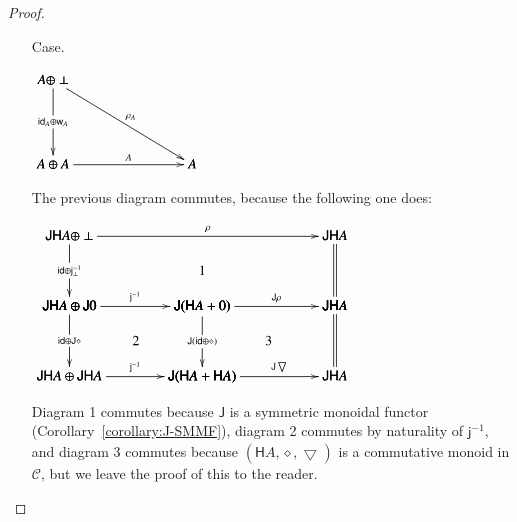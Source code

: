 \documentclass{lmcs}
\let\c\relax
\let\wn\relax
\newcommand{\cat}[1]{\mathcal{#1}}
\newcommand{\func}[1]{\mathsf{#1}}
\newcommand{\id}[0]{\mathsf{id}}
\newcommand{\w}[1]{\mathsf{w}_{#1}}
\newcommand{\c}[1]{\mathsf{c}_{#1}}
\newcommand{\jinv}[1]{\mathsf{j}^{-1}_{#1}}
\newcommand{\wn}[0]{\mathop{?}}
\newcommand{\codiag}[1]{\bigtriangledown_{#1}}
\newenvironment{diagram}{
  \begin{center}
    \begin{math}
      \bfig
}{
      \efig
    \end{math}
  \end{center}
}
\begin{document}
\begin{proof}
\begin{itemize}
\begin{diagram}
      \square(0,-500)|amma|/`->`->`->/<950,500>[
        \func{J}(\func{H}A + \func{H}A) \oplus \func{JH}A`
        \func{J}((\func{H}A + \func{H}A) + \func{H}A)`
        \func{JH}A \oplus \func{JH}A`
        \func{J}(\func{H}A + \func{H}A);`
        \func{J}\codiag{} \oplus \id`
        \func{J}(\codiag{} + \id)`
        \jinv{}]

      \dtriangle(950,-500)|ama|/`->`->/<1900,500>[
        \func{J}(\func{H}A + \func{H}A)`
        \func{J}(\func{H}A + \func{H}A)`
        \func{JH}A;`
        \func{J}\codiag{}`
        \func{J}\codiag{}]

      \place(950,250)[(1)]
      \place(2375,250)[(2)]
      \place(475,-250)[(3)]
      \place(1900,-250)[(4)]
    \end{diagram}
    Diagram 1 commutes because $\func{J}$ is a symmetric monoidal
    functor (Corollary~\ref{corollary:J-SMMF}), diagrams 2 and 3
    commute by naturality of $\jinv{}$, and diagram 4 commutes because
    $(\func{H}A, \diamond, \codiag{})$ is a commutative monoid in
    $\cat{C}$, but we leave the proof of this to the reader.

  \item[Case.]\ \\
    \begin{diagram}
      \btriangle|maa|/->`->`->/<1000,600>[
        \wn A \oplus \perp`
        \wn A \oplus \wn A`
        \wn A;
        \id_{\wn A} \oplus \w{A}`
        \rho_{\wn A}`
        \c{A}]
    \end{diagram}
    The previous diagram commutes, because the following one does:
    \begin{diagram}
      \square|amma|/->`->`->`->/<950,500>[
        \func{JH}A \oplus \func{J}0`
        \func{J}(\func{H}A + 0)`
        \func{JH}A \oplus \func{JH}A`
        \func{J}(\func{H}A + \func{H}A);
        \jinv{}`
        \id \oplus \func{J}\diamond`
        \func{J}(\id \oplus \diamond)`
        \jinv{}]

      \square(950,0)|amma|/->``=`->/<950,500>[
        \func{J}(\func{H}A + 0)`
        \func{JH}A`
        \func{J}(\func{H}A + \func{H}A)`
        \func{JH}A;
        \func{J}\rho```
        \func{J}\codiag{}]

      \square(0,500)|amma|/->`->`=`/<1900,500>[
        \func{JH}A \oplus \perp`
        \func{JH}A`
        \func{JH}A \oplus \func{J}0`
        \func{JH}A;
        \rho`
        \id \oplus \jinv{\perp}``]

      \place(950,750)[1]
      \place(475,250)[2]
      \place(1425,250)[3]      
    \end{diagram}
    Diagram 1 commutes because $\func{J}$ is a symmetric monoidal
    functor (Corollary~\ref{corollary:J-SMMF}), diagram 2 commutes by
    naturality of $\jinv{}$, and diagram 3 commutes because
    $(\func{H}A, \diamond, \codiag{})$ is a commutative monoid in
    $\cat{C}$, but we leave the proof of this to the reader.
    

\end{itemize}
\end{proof}
\end{document}
